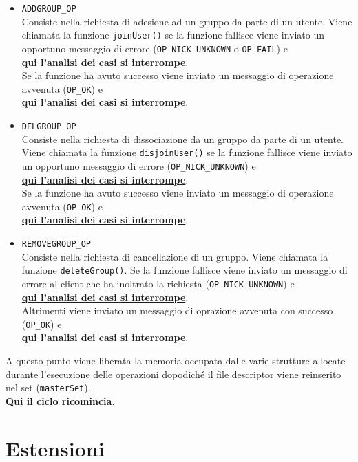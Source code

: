\documentclass[a4paper,12pt]{report}
\begin{document}
\begin{itemize}
\item \texttt{ADDGROUP\_OP}\\
  Consiste nella richiesta di adesione ad un gruppo da parte di un utente. Viene chiamata la funzione \texttt{joinUser()} se la funzione fallisce viene inviato un opportuno messaggio di errore (\texttt{OP\_NICK\_UNKNOWN} o \texttt{OP\_FAIL}) e\\ \textbf{\underline{qui l'analisi dei casi si interrompe}}.\\ Se la funzione ha avuto successo viene inviato un messaggio di operazione avvenuta (\texttt{OP\_OK}) e\\ \textbf{\underline{qui l'analisi dei casi si interrompe}}.
\item \texttt{DELGROUP\_OP}\\
  Consiste nella richiesta di dissociazione da un gruppo da parte di un utente. Viene chiamata la funzione \texttt{disjoinUser()} se la funzione fallisce viene inviato un opportuno messaggio di errore (\texttt{OP\_NICK\_UNKNOWN}) e\\ \textbf{\underline{qui l'analisi dei casi si interrompe}}.\\ Se la funzione ha avuto successo viene inviato un messaggio di operazione avvenuta (\texttt{OP\_OK}) e\\ \textbf{\underline{qui l'analisi dei casi si interrompe}}.
\item \texttt{REMOVEGROUP\_OP}\\
  Consiste nella richiesta di cancellazione di un gruppo. Viene chiamata la funzione \texttt{deleteGroup()}. Se la funzione fallisce viene inviato un messaggio di errore al client che ha inoltrato la richiesta (\texttt{OP\_NICK\_UNKNOWN}) e\\ \textbf{\underline{qui l'analisi dei casi si interrompe}}.\\ Altrimenti viene inviato un messaggio di oprazione avvenuta con successo (\texttt{OP\_OK}) e\\ \textbf{\underline{qui l'analisi dei casi si interrompe}}.
\end{itemize}

A questo punto viene liberata la memoria occupata dalle varie strutture allocate durante l'esecuzione delle operazioni dopodiché il file descriptor viene reinserito nel set (\texttt{masterSet}).\\ \textbf{\underline{Qui il ciclo ricomincia}}.

\section*{Estensioni}
\end{document}

